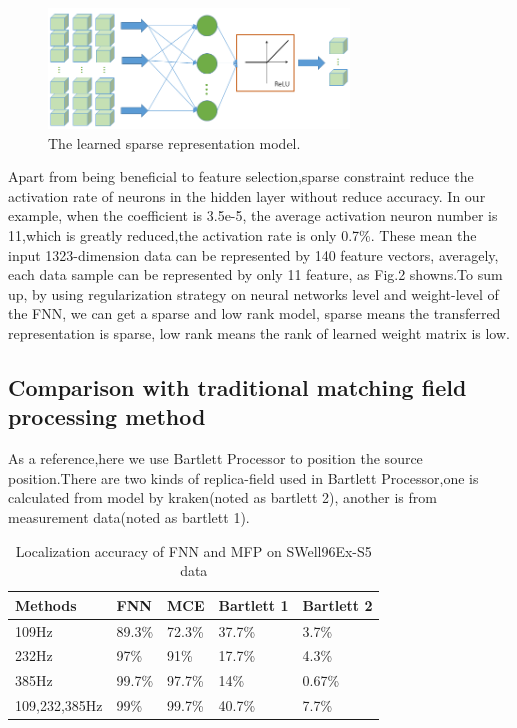 \begin{figure}
\includegraphics[width=8cm]{figure/sparse_represention_model}
\caption{The learned sparse representation model.}
\end{figure}

Apart from being beneficial to feature selection,sparse constraint reduce the activation rate of neurons in the hidden layer without reduce accuracy. In our example, when the coefficient is 3.5e-5, the average activation neuron number is 11,which is greatly reduced,the activation rate is only 0.7{\%}.
These mean the input 1323-dimension data can be represented by 140 feature vectors, averagely, each data sample can be represented by only 11 feature, as Fig.2 showns.To sum up, by using regularization strategy on neural networks level and weight-level of the FNN, we can get a sparse and low rank model, sparse means the transferred representation is sparse, low rank means the rank of learned weight matrix is low.

\subsection{Comparison with traditional matching field processing method}
As a reference,here we use Bartlett Processor to position the source position.There are two kinds of replica-field used in Bartlett Processor,one is calculated from model by kraken(noted as bartlett 2), another is from measurement data(noted as bartlett 1).
\begin{table}[]
\caption{Localization accuracy of FNN and MFP on SWell96Ex-S5 data}
\label{my-label}
\begin{tabular}{@{}lllll@{}}
\toprule
Methods       & FNN    & MCE    & Bartlett 1 & Bartlett 2 \\ \midrule
109Hz         & 89.3\% & 72.3\% & 37.7\%     & 3.7\%      \\
232Hz         & 97\%   & 91\%   & 17.7\%     & 4.3\%      \\
385Hz         & 99.7\% & 97.7\% & 14\%       & 0.67\%     \\
109,232,385Hz & 99\%   & 99.7\% & 40.7\%     & 7.7\%      \\ \bottomrule
\end{tabular}
\end{table}

